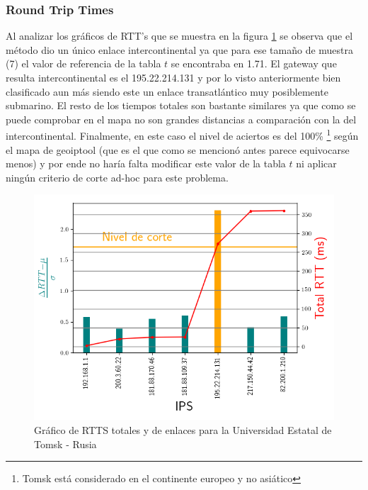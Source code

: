 \subsubsection{Round Trip Times}

Al analizar los gráficos de RTT's que se muestra en la figura
\ref{fig:rtts_tsu} se observa que el método dio un único enlace
intercontinental ya que para ese tamaño de muestra (7) el valor de referencia
de la tabla $t$ se encontraba en 1.71. El gateway que resulta intercontinental
es el 195.22.214.131 y por lo visto anteriormente bien clasificado aun más
siendo este un enlace transatlántico muy posiblemente submarino. El resto de los
tiempos totales son bastante similares ya que como se puede comprobar en el mapa
no son grandes distancias a comparación con la del intercontinental. Finalmente,
en este caso el nivel de aciertos es del 100\% \footnote{Tomsk está considerado
en el continente europeo y no asiático} según el mapa de geoiptool (que es el que como se mencionó
antes parece equivocarse menos) y por ende no haría falta modificar este valor de
la tabla $t$ ni aplicar ningún criterio de corte ad-hoc para este problema.

\begin{figure}[ht]\label{fig:rtts_tsu}
	\begin{center}
		\includegraphics[width=0.6\columnwidth]{imagenes/rtts_tsu.png}
		\caption{Gráfico de RTTS totales y de enlaces para la Universidad Estatal de Tomsk - Rusia}
	\end{center}
\end{figure}

